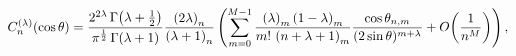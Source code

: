 \[\mathop{C^{(\lambda)}_{n}\/}\nolimits\!\left(\mathop{\cos\/}\nolimits\theta%
\right)=\frac{2^{2\lambda}\mathop{\Gamma\/}\nolimits\!\left(\lambda+\frac{1}{2%
}\right)}{\pi^{\frac{1}{2}}\mathop{\Gamma\/}\nolimits\!\left(\lambda+1\right)}%
\frac{\left(2\lambda\right)_{n}}{\left(\lambda+1\right)_{n}}\*\left(\sum_{m=0}%
^{M-1}\dfrac{\left(\lambda\right)_{m}\left(1-\lambda\right)_{m}}{m!\,\left(n+%
\lambda+1\right)_{m}}\dfrac{\mathop{\cos\/}\nolimits\theta_{n,m}}{(2\mathop{%
\sin\/}\nolimits\theta)^{m+\lambda}}+\mathop{O\/}\nolimits\!\left(\frac{1}{n^{%
M}}\right)\right),\]